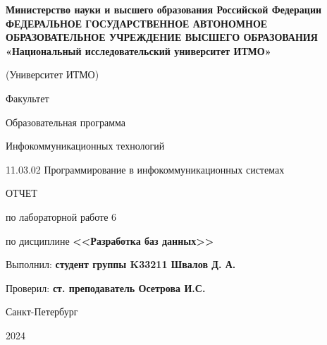 \documentclass[a4paper, 14pt]{extarticle}
\begin{document}
\begin{titlepage}
  \vspace{0pt plus2fill}
  \noindent

  \vspace{0pt plus6fill}
  \begin{center}
    {
    \bfseries
    Министерство науки и высшего образования Российской Федерации
    {
    \scriptsize
    ФЕДЕРАЛЬНОЕ ГОСУДАРСТВЕННОЕ АВТОНОМНОЕ ОБРАЗОВАТЕЛЬНОЕ УЧРЕЖДЕНИЕ ВЫСШЕГО
    ОБРАЗОВАНИЯ
    }
    «Национальный исследовательский университет ИТМО»

    (Университет ИТМО)

    \begin{minipage}[t]{0.42\textwidth}
      \vspace*{0pt}
      \begin{flushright}
        Факультет

        Образовательная программа
      \end{flushright}
    \end{minipage}
    \begin{minipage}[t]{0.57\textwidth}
      \vspace*{0pt}
      \begin{flushright}
        Инфокоммуникационных технологий

        11.03.02 Программирование в инфокоммуникационных системах
      \end{flushright}
    \end{minipage}
    }

    \vspace{0pt plus5fill}

    \LARGE{
      ОТЧЕТ

      по лабораторной работе 6

      по дисциплине \textbf{<<Разработка баз данных>>}
    }
  \end{center}

  \vspace{0pt plus4fill}
  \begin{flushright}
    Выполнил: \textbf{студент группы K33211 Швалов Д. А.}

    Проверил: \textbf{ст. преподаватель Осетрова И.С.}
  \end{flushright}

  \vspace{0pt plus8fill}
  \begin{center}
    Санкт-Петербург

    2024
  \end{center}
\end{titlepage}
\end{document}
